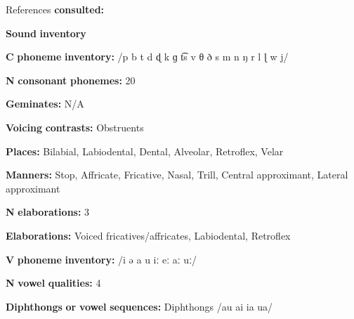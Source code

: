 \begin{styleBody}
References \textbf{consulted:} \citet{Chen2006}
\end{styleBody}

\begin{styleBody}
\textbf{Sound} \textbf{inventory}
\end{styleBody}

\begin{styleBody}
\textbf{C} \textbf{phoneme} \textbf{inventory:} /p b t d ɖ k ɡ t͡s v θ ð s m n ŋ r l ɭ w j/
\end{styleBody}

\begin{styleBody}
\textbf{N} \textbf{consonant} \textbf{phonemes:} 20
\end{styleBody}

\begin{styleBody}
\textbf{Geminates:} N/A
\end{styleBody}

\begin{styleBody}
\textbf{Voicing} \textbf{contrasts:} Obstruents
\end{styleBody}

\begin{styleBody}
\textbf{Places:} Bilabial, Labiodental, Dental, Alveolar, Retroflex, Velar
\end{styleBody}

\begin{styleBody}
\textbf{Manners:} Stop, Affricate, Fricative, Nasal, Trill, Central approximant, Lateral approximant
\end{styleBody}

\begin{styleBody}
\textbf{N} \textbf{elaborations:} 3
\end{styleBody}

\begin{styleBody}
\textbf{Elaborations:} Voiced fricatives/affricates, Labiodental, Retroflex
\end{styleBody}

\begin{styleBody}
\textbf{V} \textbf{phoneme} \textbf{inventory:} /i ə a u iː eː aː uː/
\end{styleBody}

\begin{styleBody}
\textbf{N} \textbf{vowel} \textbf{qualities:} 4
\end{styleBody}

\begin{styleBody}
\textbf{Diphthongs} \textbf{or} \textbf{vowel} \textbf{sequences:} Diphthongs /au ai ia ua/
\end{styleBody}


